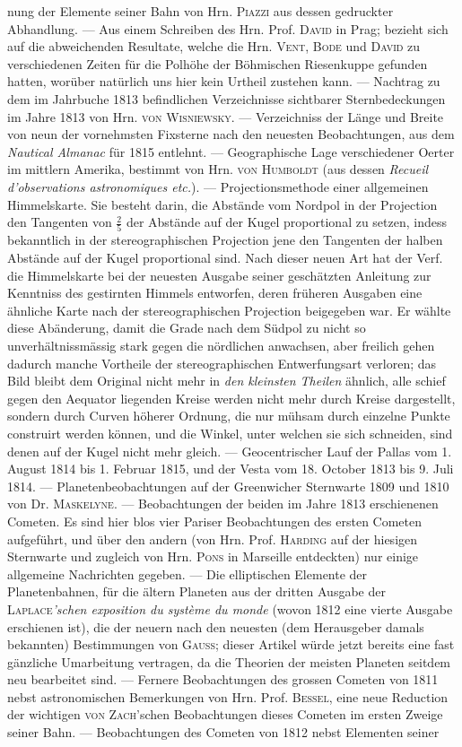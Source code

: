\noindent nung der Elemente seiner Bahn von Hrn. \textsc{Piazzi} aus dessen gedruckter Abhandlung. — Aus einem Schreiben des Hrn. Prof. \textsc{David} in Prag; bezieht sich auf die abweichenden Resultate, welche die Hrn. \textsc{Vent}, \textsc{Bode} und \textsc{David} zu verschiedenen Zeiten für die Polhöhe der Böhmischen Riesenkuppe gefunden hatten, worüber natürlich uns hier kein Urtheil zustehen kann. — Nachtrag zu dem im Jahrbuche 1813 befindlichen Verzeichnisse sichtbarer Sternbedeckungen im Jahre 1813 von Hrn. \textsc{von Wisniewsky}. — Verzeichniss der Länge und Breite von neun der vornehmsten Fixsterne nach den neuesten Beobachtungen, aus dem \emph{Nautical Almanac} für 1815 entlehnt. — Geographische Lage verschiedener Oerter im mittlern Amerika, bestimmt von Hrn. \textsc{von Humboldt} (aus dessen \emph{Recueil d'observations astronomiques etc.}). — Projectionsmethode einer allgemeinen Himmelskarte. Sie besteht darin, die Abstände vom Nordpol in der Projection den Tangenten von $\frac{2}{5}$ der Abstände auf der Kugel proportional zu setzen, indess bekanntlich in der stereographischen Projection jene den Tangenten der halben Abstände auf der Kugel proportional sind. Nach dieser neuen Art hat der Verf. die Himmelskarte bei der neuesten Ausgabe seiner geschätzten Anleitung zur Kenntniss des gestirnten Himmels entworfen, deren früheren Ausgaben eine ähnliche Karte nach der stereographischen Projection beigegeben war. Er wählte diese Abänderung, damit die Grade nach dem Südpol zu nicht so unverhältnissmässig stark gegen die nördlichen anwachsen, aber freilich gehen dadurch manche Vortheile der stereographischen Entwerfungsart verloren; das Bild bleibt dem Original nicht mehr in \emph{den kleinsten Theilen} ähnlich, alle schief gegen den Aequator liegenden Kreise werden nicht mehr durch Kreise dargestellt, sondern durch Curven höherer Ordnung, die nur mühsam durch einzelne Punkte construirt werden können, und die Winkel, unter welchen sie sich schneiden, sind denen auf der Kugel nicht mehr gleich. — Geocentrischer Lauf der Pallas vom 1. August 1814 bis 1. Februar 1815, und der Vesta vom 18. October 1813 bis 9. Juli 1814. — Planetenbeobachtungen auf der Greenwicher Sternwarte 1809 und 1810 von Dr. \textsc{Maskelyne}. — Beobachtungen der beiden im Jahre 1813 erschienenen Cometen. Es sind hier blos vier Pariser Beobachtungen des ersten Cometen aufgeführt, und über den andern (von Hrn. Prof. \textsc{Harding} auf der hiesigen Sternwarte und zugleich von Hrn. \textsc{Pons} in Marseille entdeckten) nur einige allgemeine Nachrichten gegeben. — Die elliptischen Elemente der Planetenbahnen, für die ältern Planeten aus der dritten Ausgabe der \textsc{Laplace}\emph{'schen exposition du système du monde} (wovon 1812 eine vierte Ausgabe erschienen ist), die der neuern nach den neuesten (dem Herausgeber damals bekannten) Bestimmungen von \textsc{Gauss}; dieser Artikel würde jetzt bereits eine fast gänzliche Umarbeitung vertragen, da die Theorien der meisten Planeten seitdem neu bearbeitet sind. — Fernere Beobachtungen des grossen Cometen von 1811 nebst astronomischen Bemerkungen von Hrn. Prof. \textsc{Bessel}, eine neue Reduction der wichtigen \textsc{von Zach}'schen Beobachtungen dieses Cometen im ersten Zweige seiner Bahn. — Beobachtungen des Cometen von 1812 nebst Elementen seiner 